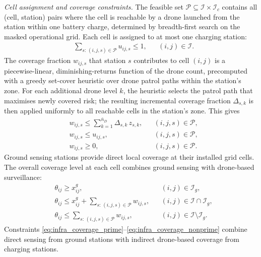\documentclass[pdflatex,sn-mathphys-num]{sn-jnl}%
\theoremstyle{thmstyleone}%
\theoremstyle{thmstyletwo}%
\theoremstyle{thmstylethree}%
\begin{document}
\noindent \textit{Cell assignment and coverage constraints.}
The feasible set $\mathcal P \subseteq \mathcal I \times \mathcal I_c$ contains all (cell, station) pairs where the cell is reachable by a drone launched from the station within one battery charge, determined by breadth-first search on the masked operational grid. Each cell is assigned to at most one charging station:
\begin{align}
& \sum_{s:\,(i,j,s)\in\mathcal P} u_{ij,s}\le 1,
&&  (i,j)\in\mathcal I.
\label{eq:infra_assign}
\end{align}
The coverage fraction $w_{ij,s}$ that station $s$ contributes to cell $(i,j)$ is a piecewise-linear, diminishing-returns function of the drone count, precomputed with a greedy set-cover heuristic over drone patrol paths within the station's zone. For each additional drone level $k$, the heuristic selects the patrol path that maximises newly covered risk; the resulting incremental coverage fraction $\Delta_{s,k}$ is then applied uniformly to all reachable cells in the station's zone. This gives
\begin{align}
& w_{ij,s}\le \sum_{k=1}^{\bar n_D}\Delta_{s,k}\,z_{s,k},
&&  (i,j,s)\in\mathcal P,
\label{eq:infra_wbound_drone}\\
& w_{ij,s}\le u_{ij,s},
&&  (i,j,s)\in\mathcal P,
\label{eq:infra_wbound_assign}\\
& w_{ij,s}\ge 0,
&&  (i,j,s)\in\mathcal P.
\label{eq:infra_wpos}
\end{align}
Ground sensing stations provide direct local coverage at their installed grid cells. The overall coverage level at each cell combines ground sensing with drone-based surveillance:
\begin{align}
& \theta_{ij}\ge x^g_{ij},
&&  (i,j)\in\mathcal I_g,
\label{eq:infra_ground_only}\\
& \theta_{ij}\le x^g_{ij}+\sum_{s:\,(i,j,s)\in\mathcal P}w_{ij,s},
&&  (i,j)\in\mathcal I\cap\mathcal I_g,
\label{eq:infra_coverage_prime}\\
& \theta_{ij}\le \sum_{s:\,(i,j,s)\in\mathcal P}w_{ij,s},
&&  (i,j)\in\mathcal I\setminus\mathcal I_g.
\label{eq:infra_coverage_nonprime}
\end{align}
Constraints \eqref{eq:infra_coverage_prime}--\eqref{eq:infra_coverage_nonprime} combine direct sensing from ground stations with indirect drone-based coverage from charging stations.\\
\\
\end{document}
